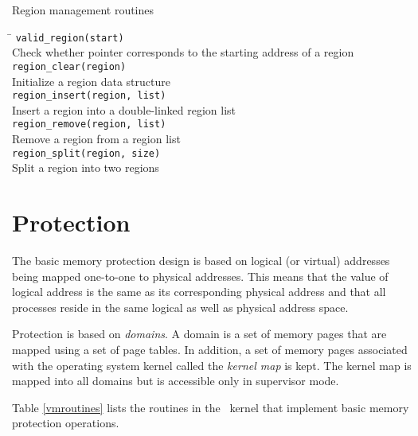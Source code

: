 \begin{table}[h]
\caption{\label{regionroutines} Region management routines}
\begin{tabbing}
\hspace{0.25in} \= \kill
{\tt valid\_region(start)} \\
\> Check whether pointer corresponds to the starting address of a region \\

{\tt region\_clear(region)} \\
\> Initialize a region data structure \\

{\tt region\_insert(region, list)} \\
\> Insert a region into a double-linked region list \\

{\tt region\_remove(region, list)} \\
\> Remove a region from a region list \\

{\tt region\_split(region, size)} \\
\> Split a region into two regions \\
\end{tabbing} \end{table}


\section{Protection}

The basic memory protection design is based on logical
(or virtual) addresses being mapped one-to-one to physical
addresses.  This means that the value of logical address
is the same as its corresponding physical address and that
all processes reside in the same logical as well as physical
address space.

Protection is based on {\em domains}.  A domain is a set of
memory pages that are mapped using a set of page tables.
In addition, a set of memory pages associated with the operating
system kernel called the {\em kernel map} is kept.  The kernel
map is mapped into all domains but is accessible only in
supervisor mode.

Table \ref{vmroutines} lists the routines in the \roadrunner\ 
kernel that implement basic memory protection operations.

